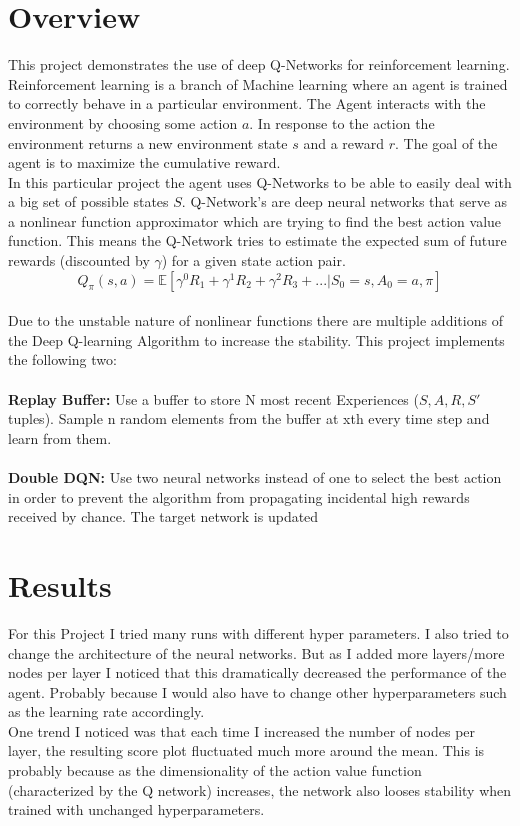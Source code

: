 \documentclass[12pt,a4paper]{article}
\begin{document}
    \section{Overview}\label{sec:overview}
    This project demonstrates the use of deep Q-Networks for reinforcement learning.
    Reinforcement learning is a branch of Machine learning where an agent is trained to correctly behave in
    a particular environment.
    The Agent interacts with the environment by choosing some action $a$.
    In response to the action the environment returns a new environment state $s$ and a reward $r$.
    The goal of the agent is to maximize the cumulative reward.
    \\
    In this particular project the agent uses Q-Networks to be able to easily deal with a big set of possible states $S$.
    Q-Network's are deep neural networks that serve as a nonlinear function approximator which are trying to find the best action value function.
    This means the Q-Network tries to estimate the expected sum of future rewards (discounted by $\gamma$) for a given state action pair.
    $$Q_{\pi}(s,a)=\mathbb{E}[\gamma ^{0}R_{1}+\gamma ^{1}R_{2}+\gamma ^{2}R_{3}+...|S_{0}=s, A_{0}=a, \pi]$$
    \\
    Due to the unstable nature of nonlinear functions there are multiple additions of the Deep Q-learning Algorithm to increase the stability.
    This project implements the following two:
    \\\\
    \textbf{Replay Buffer:}
    Use a buffer to store N most recent Experiences ($S, A, R, S'$ tuples).
    Sample n random elements from the buffer at xth every time step and learn from them.
    \\\\
    \textbf{Double DQN:}
    Use two neural networks instead of one to select the best action in order to prevent the algorithm from propagating incidental high rewards received by chance.
    The target network is updated


    \section{Results}\label{sec:results}
    For this Project I tried many runs with different hyper parameters.
    I also tried to change the architecture of the neural networks.
    But as I added more layers/more nodes per layer I noticed that this dramatically decreased the performance of the agent.
    Probably because I would also have to change other hyperparameters such as the learning rate accordingly.
    \\
    One trend I noticed was that each time I increased the number of nodes per layer, the resulting score plot fluctuated much more around the mean.
    This is probably because as the dimensionality of the action value function (characterized by the Q network) increases, the network also looses stability when trained with unchanged hyperparameters.
\end{document}

